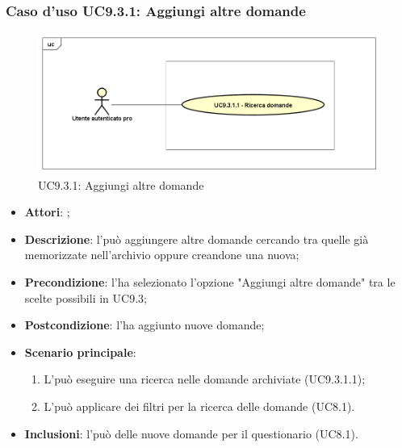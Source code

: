 		 \subsubsection{Caso d'uso UC9.3.1: Aggiungi altre domande}
		 \label{UC9.3.1}
		 \begin{figure}[h]
		 	\centering
		 	\includegraphics[scale=0.5,keepaspectratio]{UML/UC9_3_1.png}
		 	\caption{UC9.3.1: Aggiungi altre domande}
		 \end{figure}
		 \FloatBarrier
		 \begin{itemize}
		 	\item \textbf{Attori}: \uaupro;
		 	\item \textbf{Descrizione}: l'\uaupro può aggiungere altre domande cercando tra quelle già memorizzate nell'archivio oppure creandone una nuova; 
		 	\item \textbf{Precondizione}: l'\uaupro ha selezionato l'opzione "Aggiungi altre domande" tra le scelte possibili in UC9.3;
		 	\item \textbf{Postcondizione}: l'\uaupro ha aggiunto nuove domande;
		 	\item \textbf{Scenario principale}:
		 	\begin{enumerate}
		 		\item L'\uaupro può eseguire una ricerca nelle domande archiviate (UC9.3.1.1);
		 		\item L'\uaupro può applicare dei filtri per la ricerca delle domande (UC8.1).
		 	\end{enumerate}
		 	\item \textbf{Inclusioni}: l'\uaupro può delle nuove domande per il questionario (UC8.1).		
		 \end{itemize}
		 
